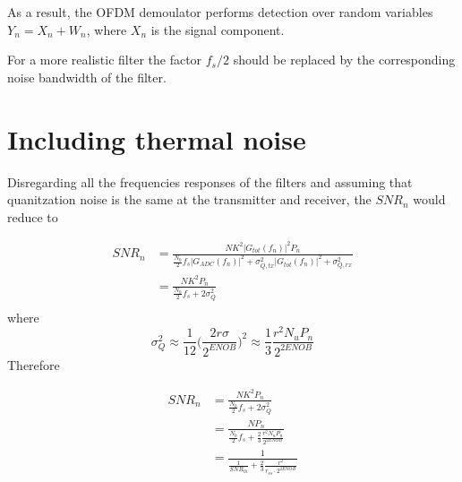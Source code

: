 \documentclass[a4paper]{article}
\begin{document}
As a result, the OFDM demoulator performs detection over random variables $Y_n = X_n + W_n$, where $X_n$ is the signal component.

For a more realistic filter the factor $f_s/2$ should be replaced by the corresponding noise bandwidth of the filter.


\section{Including thermal noise}

Disregarding all the frequencies responses of the filters and assuming that quanitzation noise is the same at the transmitter and receiver, the $SNR_n$ would reduce to

\begin{align} \nonumber
SNR_n & =  \frac{NK^2|G_{tot}(f_n)|^2P_n}{\frac{N_0}{2}f_s|G_{ADC}(f_n)|^2 + \sigma_{Q,tx}^2|G_{tot}(f_n)|^2 + \sigma_{Q,rx}^2} \\
& =  \frac{NK^2P_n}{\frac{N_0}{2}f_s + 2\sigma_{Q}^2} \\
\end{align}
where \begin{equation}
\sigma_Q^2 \approx \frac{1}{12}\bigg(\frac{2r\sigma}{2^{ENOB}}\bigg)^2 \approx \frac{1}{3}\frac{r^2N_uP_n}{2^{2ENOB}}
\end{equation}
Therefore

\begin{align} \nonumber
SNR_n & =  \frac{NK^2P_n}{\frac{N_0}{2}f_s + 2\sigma_{Q}^2} \\
& =  \frac{NP_n}{\frac{N_0}{2}f_s + \frac{2}{3}\frac{r^2N_uP_n}{2^{2ENOB}}} \\
& =  \frac{1}{\frac{1}{SNR_{th}} + \frac{2}{3}\frac{r^2}{r_{os}\cdot 2^{2ENOB}}} \\
\end{align}
\end{document}
